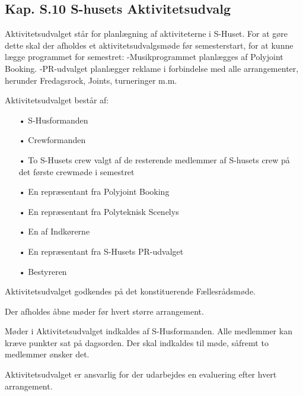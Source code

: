 \begin{list}
\subsection{Kap. S.10 S-husets Aktivitetsudvalg}
\label{s:shus-aktivitetsudvalg}
Aktivitetsudvalget står for planlægning af aktiviteterne i S-Huset. For at gøre dette skal der afholdes et
aktivitetsudvalgsmøde før semesterstart, for at kunne lægge programmet for semestret:
-Musikprogrammet planlægges af Polyjoint Booking.
-PR-udvalget planlægger reklame i forbindelse med alle arrangementer, herunder Fredagsrock, Joints,
turneringer m.m.
\item
Aktivitetsudvalget består af:
	\begin{enumerate}
	\item[•] S-Husformanden
	\item[•] Crewformanden
	\item[•] To S-Husets crew valgt af de resterende medlemmer af S-husets crew på det første crewmøde i
	semestret
	\item[•] En repræsentant fra Polyjoint Booking
	\item[•] En repræsentant fra Polyteknisk Scenelys
	\item[•] En af Indkørerne
	\item[•] En repræsentant fra S-Husets PR-udvalget
	\item[•] Bestyreren
	\end{enumerate}
Aktivitetsudvalget godkendes på det konstituerende Fællesrådsmøde.
\item Der afholdes åbne møder før hvert større arrangement.
\item Møder i Aktivitetsudvalget indkaldes af S-Husformanden. Alle medlemmer kan kræve punkter sat på dagsorden. Der skal indkaldes til møde, såfremt to medlemmer ønsker det.
\item Aktivitetsudvalget er ansvarlig for der udarbejdes en evaluering efter hvert arrangement.
\end{list}
